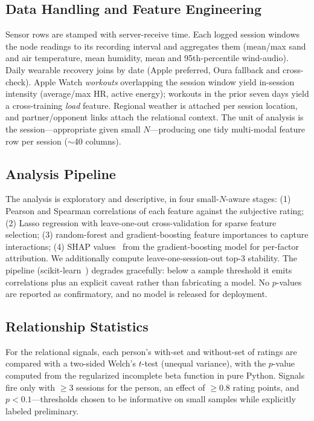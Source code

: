 \documentclass[sigconf,nonacm]{acmart}
\begin{document}
\subsection{Data Handling and Feature Engineering}
Sensor rows are stamped with server-receive time. Each logged session windows the node readings to its recording interval and aggregates them (mean/max sand and air temperature, mean humidity, mean and 95th-percentile wind-audio). Daily wearable recovery joins by date (Apple preferred, Oura fallback and cross-check). Apple Watch \emph{workouts} overlapping the session window yield in-session intensity (average/max HR, active energy); workouts in the prior seven days yield a cross-training \emph{load} feature. Regional weather is attached per session location, and partner/opponent links attach the relational context. The unit of analysis is the session---appropriate given small $N$---producing one tidy multi-modal feature row per session ($\sim$40 columns).

\subsection{Analysis Pipeline}
The analysis is exploratory and descriptive, in four small-$N$-aware stages: (1) Pearson and Spearman correlations of each feature against the subjective rating; (2) Lasso regression with leave-one-out cross-validation for sparse feature selection; (3) random-forest and gradient-boosting feature importances to capture interactions; (4) SHAP values~\cite{lundberg2017} from the gradient-boosting model for per-factor attribution. We additionally compute leave-one-session-out top-3 stability. The pipeline (scikit-learn~\cite{sklearn}) degrades gracefully: below a sample threshold it emits correlations plus an explicit caveat rather than fabricating a model. No $p$-values are reported as confirmatory, and no model is released for deployment.

\subsection{Relationship Statistics}
For the relational signals, each person's with-set and without-set of ratings are compared with a two-sided Welch's $t$-test (unequal variance), with the $p$-value computed from the regularized incomplete beta function in pure Python. Signals fire only with $\geq$3 sessions for the person, an effect of $\geq$0.8 rating points, and $p<0.1$---thresholds chosen to be informative on small samples while explicitly labeled preliminary.
\end{document}
